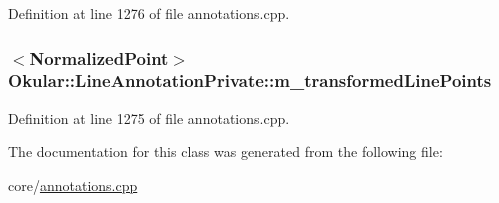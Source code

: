 Definition at line 1276 of file annotations.\+cpp.

\hypertarget{classOkular_1_1LineAnnotationPrivate_a68a2ec899127d3f2d1f0c69da619b1c3}{
\subsubsection[{m\+\_\+transformed\+Line\+Points}]{$<${\bf Normalized\+Point}$>$ Okular\+::\+Line\+Annotation\+Private\+::m\+\_\+transformed\+Line\+Points}}\label{classOkular_1_1LineAnnotationPrivate_a68a2ec899127d3f2d1f0c69da619b1c3}


Definition at line 1275 of file annotations.\+cpp.



The documentation for this class was generated from the following file\+:\begin{DoxyCompactItemize}
\item 
core/\hyperlink{annotations_8cpp}{annotations.\+cpp}\end{DoxyCompactItemize}
